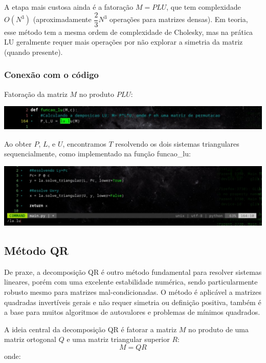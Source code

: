 \documentclass{article}
\begin{document}
    A etapa mais custosa ainda é a fatoração $M = PLU$, que tem complexidade $O(N^3)$ (aproximadamente $\dfrac{2}{3}N^3$ operações para matrizes densas). Em teoria, esse método tem a mesma ordem de complexidade de Cholesky, mas na prática LU geralmente requer mais operações por não explorar a simetria da matriz (quando presente).

    \subsubsection{Conexão com o código}

    Fatoração da matriz $M$ no produto $PLU$:

    \begin{center}
    \includegraphics[width=0.8\linewidth]{imgs/lu_1.png}
    \end{center}

    Ao obter $P$, $L$, e $U$, encontramos $T$ resolvendo os dois sistemas triangulares sequencialmente, como implementado na função funcao\_lu:

    \begin{center}
    \includegraphics[width=0.8\linewidth]{imgs/lu_2.png}
    \end{center}

    \subsection{Método QR}

    De praxe, a decomposição QR é outro método fundamental para resolver sistemas lineares, porém com uma excelente estabilidade numérica, sendo particularmente robusto mesmo para matrizes mal-condicionadas. O método é aplicável a matrizes quadradas invertíveis gerais e não requer simetria ou definição positiva, também é a base para muitos algoritmos de autovalores e problemas de mínimos quadrados.

    A ideia central da decomposição QR é fatorar a matriz $M$ no produto de uma matriz ortogonal $Q$ e uma matriz triangular superior $R$:
    \[ M = QR \]
    onde:
\end{document}

